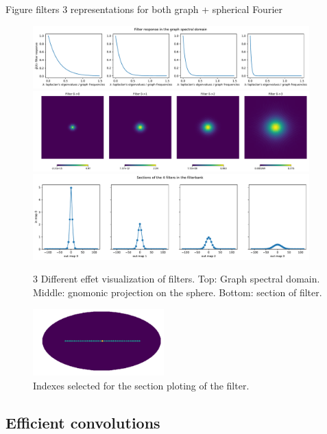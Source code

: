 \documentclass[preprint,12pt,authoryear]{elsarticle}
\newcommand{\assign}[1]{{\color[rgb]{.8,.5,.8}{Assigned: #1 }}}
\begin{document}
Figure filters 3 representations for both graph + spherical Fourier
\begin{figure}[!ht]
\centering
\includegraphics[width=0.95\textwidth]{figures/gaussian_filters_spectral.pdf}
\includegraphics[width=0.95\textwidth]{figures/gaussian_filters_gnomonic.pdf}
\includegraphics[width=0.95\textwidth]{figures/gaussian_filters_section.pdf}
\caption{3 Different effet visualization of filters. Top: Graph spectral domain. Middle: gnomonic projection on the sphere. Bottom: section of filter.}
\label{fig:gaussian_filters_visualization}
\end{figure}


\begin{figure}[!ht]
\centering
\includegraphics[width=0.45\textwidth]{figures/index_plotting_order20_nside16.pdf}

\caption{Indexes selected for the section ploting of the filter.}
\label{fig:index_section}
\end{figure}


\subsection{Efficient convolutions}
\assign{Michaël}
\end{document}
